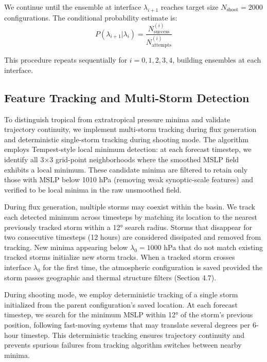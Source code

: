 \documentclass[11pt]{article}
\begin{document}
We continue until the ensemble at interface $\lambda_{i+1}$ reaches target size $N_{\text{shoot}} = 2000$ configurations. The conditional probability estimate is:
\begin{equation}
P(\lambda_{i+1} | \lambda_i) = \frac{N_{\text{success}}^{(i)}}{N_{\text{attempts}}^{(i)}}
\end{equation}

This procedure repeats sequentially for $i = 0, 1, 2, 3, 4$, building ensembles at each interface.

\subsection{Feature Tracking and Multi-Storm Detection}

\label{sec:tracking}
To distinguish tropical from extratropical pressure minima and validate trajectory continuity, we implement multi-storm tracking during flux generation and deterministic single-storm tracking during shooting mode. The algorithm employs Tempest-style local minimum detection: at each forecast timestep, we identify all 3×3 grid-point neighborhoods where the smoothed MSLP field exhibits a local minimum. These candidate minima are filtered to retain only those with MSLP below 1010 hPa (removing weak synoptic-scale features) and verified to be local minima in the raw unsmoothed field.

During flux generation, multiple storms may coexist within the basin. We track each detected minimum across timesteps by matching its location to the nearest previously tracked storm within a 12° search radius. Storms that disappear for two consecutive timesteps (12 hours) are considered dissipated and removed from tracking. New minima appearing below $\lambda_0 = 1000$ hPa that do not match existing tracked storms initialize new storm tracks. When a tracked storm crosses interface $\lambda_0$ for the first time, the atmospheric configuration is saved provided the storm passes geographic and thermal structure filters (Section 4.7).

During shooting mode, we employ deterministic tracking of a single storm initialized from the parent configuration's saved location. At each forecast timestep, we search for the minimum MSLP within 12° of the storm's previous position, following fast-moving systems that may translate several degrees per 6-hour timestep. This deterministic tracking ensures trajectory continuity and prevents spurious failures from tracking algorithm switches between nearby minima.
\end{document}
